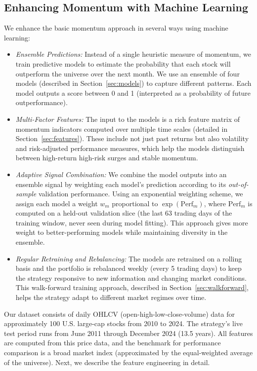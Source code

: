 \documentclass[conference]{IEEEtran}
\begin{document}
\subsection{Enhancing Momentum with Machine Learning}
We enhance the basic momentum approach in several ways using machine learning:
\begin{itemize}
    \item \emph{Ensemble Predictions:} Instead of a single heuristic measure of momentum, we train predictive models to estimate the probability that each stock will outperform the universe over the next month. We use an ensemble of four models (described in Section~\ref{sec:models}) to capture different patterns. Each model outputs a score between 0 and 1 (interpreted as a probability of future outperformance).
    \item \emph{Multi-Factor Features:} The input to the models is a rich feature matrix of momentum indicators computed over multiple time scales (detailed in Section~\ref{sec:features}). These include not just past returns but also volatility and risk-adjusted performance measures, which help the models distinguish between high-return high-risk surges and stable momentum.
    \item \emph{Adaptive Signal Combination:} We combine the model outputs into an ensemble signal by weighting each model's prediction according to its \emph{out-of-sample} validation performance. Using an exponential weighting scheme, we assign each model a weight $w_m$ proportional to $\exp(\mathrm{Perf}_m)$, where $\mathrm{Perf}_m$ is computed on a held-out validation slice (the last 63 trading days of the training window, never seen during model fitting). This approach gives more weight to better-performing models while maintaining diversity in the ensemble.
    \item \emph{Regular Retraining and Rebalancing:} The models are retrained on a rolling basis and the portfolio is rebalanced weekly (every 5 trading days) to keep the strategy responsive to new information and changing market conditions. This walk-forward training approach, described in Section~\ref{sec:walkforward}, helps the strategy adapt to different market regimes over time.
\end{itemize}

Our dataset consists of daily OHLCV (open-high-low-close-volume) data for approximately 100 U.S. large-cap stocks from 2010 to 2024. The strategy's live test period runs from June 2011 through December 2024 (13.5 years). All features are computed from this price data, and the benchmark for performance comparison is a broad market index (approximated by the equal-weighted average of the universe). Next, we describe the feature engineering in detail.
\end{document}
